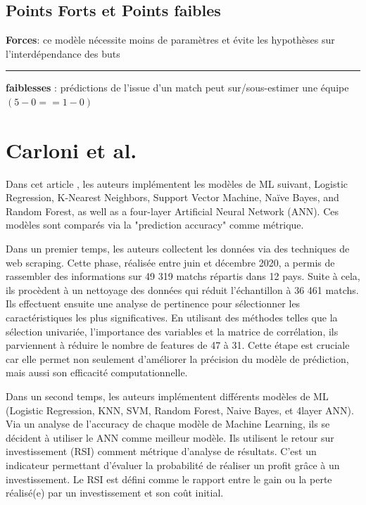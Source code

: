 \documentclass[11pt, a4paper]{article}
\begin{document}
\subsection{Points Forts et Points faibles}
\textbf{Forces}:  ce modèle nécessite moins de paramètres et évite les 
hypothèses sur l'interdépendance des buts
\vspace*{0.5cm}
\hrule
\vspace*{0.5cm}
\textbf{faiblesses} : prédictions de l'issue d'un match peut sur/sous-estimer une équipe $(5-0 == 1-0)$



\section{Carloni et al.}


Dans cet article \cite{carloni}, les auteurs implémentent les modèles de ML suivant,   
Logistic Regression, K-Nearest Neighbors, Support Vector Machine, Naïve Bayes, 
and Random Forest, as well as a four-layer Artificial Neural Network (ANN). Ces 
modèles sont comparés via la "prediction accuracy" comme métrique.

Dans un premier temps, les auteurs collectent les données via des techniques de web 
scraping. Cette phase, réalisée entre juin et décembre 2020, a permis de rassembler 
des informations sur 49 319 matchs répartis dans 12 pays. Suite à cela, ils 
procèdent à un nettoyage des données qui réduit l'échantillon à 36 461 matchs. Ils 
effectuent ensuite une analyse de pertinence pour sélectionner les caractéristiques 
les plus significatives. En utilisant des méthodes telles que la sélection univariée, 
l'importance des variables et la matrice de corrélation, ils parviennent à réduire le 
nombre de features de 47 à 31. Cette étape est cruciale car elle permet non seulement 
d'améliorer la précision du modèle de prédiction, mais aussi son efficacité 
computationnelle.

Dans un second temps, les auteurs implémentent différents modèles de ML 
(Logistic Regression, KNN, SVM, Random Forest, Naive Bayes, et 4layer ANN).
Via un analyse de l'accuracy de chaque modèle de Machine Learning, ils se décident à 
utiliser le ANN comme meilleur modèle.
Ils utilisent le retour sur investissement (RSI) comment métrique d'analyse de 
résultats. C'est un indicateur permettant d'évaluer la probabilité de réaliser un 
profit grâce à un investissement. Le RSI est défini comme le rapport entre le gain 
ou la perte réalisé(e) par un investissement et son coût initial.
\end{document}

